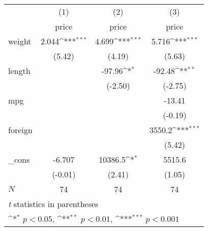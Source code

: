 {
\def\sym#1{\ifmmode^{#1}\else\(^{#1}\)\fi}
\begin{tabular}{l*{3}{c}}
\hline\hline
            &\multicolumn{1}{c}{(1)}&\multicolumn{1}{c}{(2)}&\multicolumn{1}{c}{(3)}\\
            &\multicolumn{1}{c}{price}&\multicolumn{1}{c}{price}&\multicolumn{1}{c}{price}\\
\hline
weight      &       2.044\sym{***}&       4.699\sym{***}&       5.716\sym{***}\\
            &      (5.42)         &      (4.19)         &      (5.63)         \\
[1em]
length      &                     &      -97.96\sym{*}  &      -92.48\sym{**} \\
            &                     &     (-2.50)         &     (-2.75)         \\
[1em]
mpg         &                     &                     &      -13.41         \\
            &                     &                     &     (-0.19)         \\
[1em]
foreign     &                     &                     &      3550.2\sym{***}\\
            &                     &                     &      (5.42)         \\
[1em]
\_cons      &      -6.707         &     10386.5\sym{*}  &      5515.6         \\
            &     (-0.01)         &      (2.41)         &      (1.05)         \\
\hline
\(N\)       &          74         &          74         &          74         \\
\hline\hline
\multicolumn{4}{l}{\footnotesize \textit{t} statistics in parentheses}\\
\multicolumn{4}{l}{\footnotesize \sym{*} \(p<0.05\), \sym{**} \(p<0.01\), \sym{***} \(p<0.001\)}\\
\end{tabular}
}
